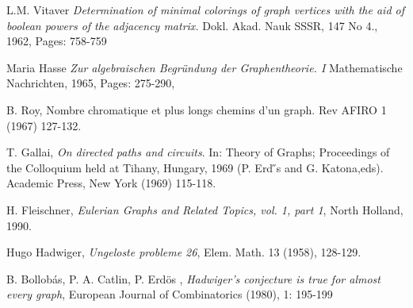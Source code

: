 \documentclass[a4paper,12pt,oneside]{book}
\begin{document}
\begin{thebibliography}{9}
 L.M. Vitaver \textit{Determination of minimal colorings of graph vertices with the aid of boolean powers of the adjacency matrix.} Dokl. Akad. Nauk SSSR, 147 No 4., 1962, Pages: 758-759

 Maria Hasse \textit{Zur algebraischen Begr\"undung der Graphentheorie. I} Mathematische Nachrichten, 1965, Pages: 275-290,

B. Roy, Nombre chromatique et plus longs chemins d'un graph. Rev AFIRO
1 (1967) 127-132.

T. Gallai, \textit{On directed paths and circuits}. In: Theory of Graphs; Proceedings of the Colloquium held at Tihany, Hungary, 1969 (P. Erd ̋s and G. Katona,eds). Academic Press, New York (1969) 115-118.

\newpage

 H. Fleischner, \textit{Eulerian Graphs and Related Topics, vol. 1, part 1}, North Holland, 1990.

 Hugo Hadwiger, \textit{Ungeloste probleme 26}, Elem. Math. 13 (1958), 128-129.

 B. Bollobás, P. A. Catlin, P.  Erd\"os , \textit{Hadwiger's conjecture is true for almost every graph}, European Journal of Combinatorics (1980), 1: 195-199




\end{thebibliography}
\end{document}
